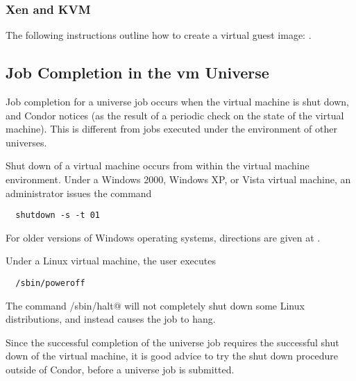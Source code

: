 \subsubsection{\label{sec:vm-disk-image-details-xen}Xen and KVM}
The following instructions outline how to create a virtual guest image:
.

\subsection{\label{sec:vm-job-completion-details}Job Completion in the vm Universe}

Job completion for a  universe job occurs when 
the virtual machine is shut down, and Condor notices 
(as the result of a periodic check on the state of the virtual machine).
This is different from jobs executed under the environment of other 
universes.

Shut down of a virtual machine occurs from within the virtual
machine environment.
Under a Windows 2000, Windows XP, or Vista virtual machine,
an administrator issues the command
\begin{verbatim}
  shutdown -s -t 01
\end{verbatim}
For older versions of Windows operating systems, 
directions are given at
.

Under a Linux virtual machine,
the  user executes
\begin{verbatim}
  /sbin/poweroff
\end{verbatim}
The command \verb@/sbin/halt@ will not completely
shut down some Linux distributions, and instead
causes the job to hang.

Since the successful completion of the  universe job
requires the successful shut down of the virtual machine,
it is good advice to try the shut down procedure outside of
Condor, before a  universe job is submitted.


